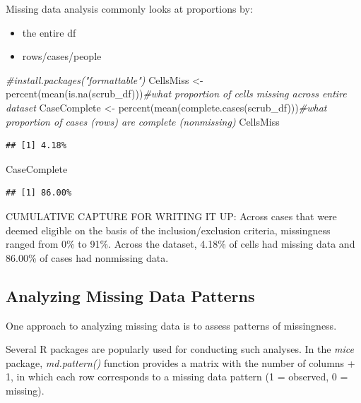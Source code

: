 \documentclass[
]{book}
\newenvironment{Shaded}{\begin{snugshade}}{\end{snugshade}}
\newcommand{\CommentTok}[1]{\textcolor[rgb]{0.56,0.35,0.01}{\textit{#1}}}
\newcommand{\FunctionTok}[1]{\textcolor[rgb]{0.00,0.00,0.00}{#1}}
\newcommand{\NormalTok}[1]{#1}
\newcommand{\OtherTok}[1]{\textcolor[rgb]{0.56,0.35,0.01}{#1}}
\providecommand{\tightlist}{%
  \setlength{\itemsep}{0pt}\setlength{\parskip}{0pt}}
\begin{document}
Missing data analysis commonly looks at proportions by:

\begin{itemize}
\tightlist
\item
  the entire df
\item
  rows/cases/people
\end{itemize}

\begin{Shaded}
\begin{Highlighting}[]
\CommentTok{\#install.packages("formattable")}
\NormalTok{CellsMiss }\OtherTok{\textless{}{-}} \FunctionTok{percent}\NormalTok{(}\FunctionTok{mean}\NormalTok{(}\FunctionTok{is.na}\NormalTok{(scrub\_df)))}\CommentTok{\#what proportion of cells missing across entire dataset}
\NormalTok{CaseComplete }\OtherTok{\textless{}{-}} \FunctionTok{percent}\NormalTok{(}\FunctionTok{mean}\NormalTok{(}\FunctionTok{complete.cases}\NormalTok{(scrub\_df)))}\CommentTok{\#what proportion of cases (rows) are complete (nonmissing)}
\NormalTok{CellsMiss}
\end{Highlighting}
\end{Shaded}

\begin{verbatim}
## [1] 4.18%
\end{verbatim}

\begin{Shaded}
\begin{Highlighting}[]
\NormalTok{CaseComplete}
\end{Highlighting}
\end{Shaded}

\begin{verbatim}
## [1] 86.00%
\end{verbatim}

CUMULATIVE CAPTURE FOR WRITING IT UP: Across cases that were deemed eligible on the basis of the inclusion/exclusion criteria, missingness ranged from 0\% to 91\%. Across the dataset, 4.18\% of cells had missing data and 86.00\% of cases had nonmissing data.

\hypertarget{analyzing-missing-data-patterns}{%
\subsection{Analyzing Missing Data Patterns}\label{analyzing-missing-data-patterns}}

One approach to analyzing missing data is to assess patterns of missingness.

Several R packages are popularly used for conducting such analyses. In the \emph{mice} package, \emph{md.pattern()} function provides a matrix with the number of columns + 1, in which each row corresponds to a missing data pattern (1 = observed, 0 = missing).
\end{document}
